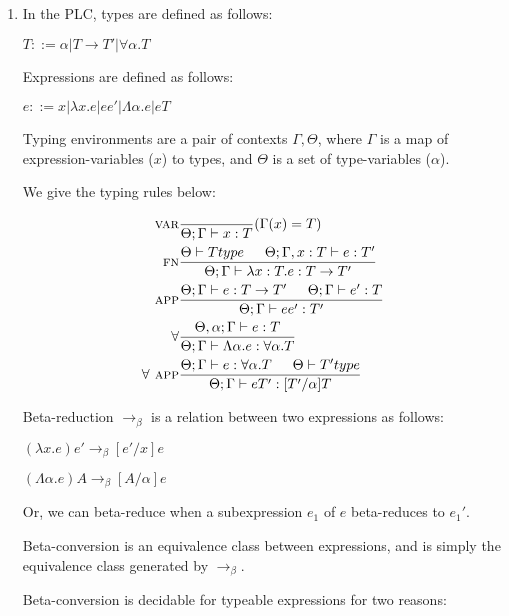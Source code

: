 


\begin{enumerate}[label=(\alph*)]
  \item
  In the PLC, types are defined as follows:

  $T ::= \alpha | T \rightarrow T' | \forall \alpha. T$

  Expressions are defined as follows:

  $e ::= x | \lambda x. e| e e' | \Lambda \alpha. e | e T$

  Typing environments are a pair of contexts $\Gamma, \Theta$, where $\Gamma$ is a map of expression-variables ($x$) to types, and $\Theta$ is a set of type-variables ($\alpha$).

  We give the typing rules below:

  \begin{align*}
    \textsc{var}&\frac{}{\Theta;\Gamma \vdash x : T}(\Gamma(x) = T)\\
    \textsc{fn}&\frac{\Theta \vdash T type \hspace{15pt} \Theta;\Gamma, x:T \vdash e : T'}{\Theta;\Gamma \vdash \lambda x:T. e : T \rightarrow T'}\\
    \textsc{app}&\frac{\Theta;\Gamma \vdash e : T \rightarrow T' \hspace{15pt} \Theta;\Gamma \vdash e': T}{\Theta;\Gamma \vdash e e' : T'}\\
    \textsc{$\forall$}&\frac{\Theta, \alpha;\Gamma \vdash e : T}{\Theta;\Gamma \vdash \Lambda \alpha.e : \forall \alpha. T}\\
    \textsc{$\forall$ app}&\frac{\Theta;\Gamma \vdash e : \forall \alpha. T \hspace{15pt} \Theta \vdash T' type}{\Theta;\Gamma \vdash e T' : [T' / \alpha] T}\\
  \end{align*}

  Beta-reduction $\rightarrow_\beta$ is a relation between two expressions as follows:

  $(\lambda x. e)e' \rightarrow_\beta [e' / x]e$

  $(\Lambda \alpha. e) A \rightarrow_\beta [A / \alpha]e$

  Or, we can beta-reduce when a subexpression $e_1$ of $e$ beta-reduces to $e_1'$.

  Beta-conversion is an equivalence class between expressions, and is simply the equivalence class generated by $\rightarrow_\beta$.

  Beta-conversion is decidable for typeable expressions for two reasons:


\end{enumerate}
